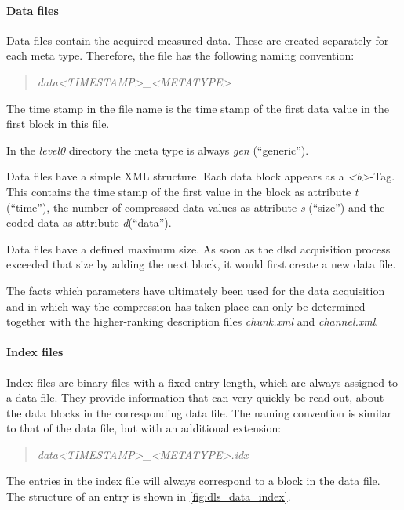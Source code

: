 \documentclass[a4paper,12pt,BCOR6mm,bibtotoc,idxtotoc]{scrbook}
\begin{document}
\paragraph{Data files} Data files contain the acquired measured data. These are created separately for each meta type. Therefore, the file has the following naming convention:

\begin{quote} \textit{data\textless TIMESTAMP\textgreater\_\textless METATYPE\textgreater} \end{quote}

The time stamp in the file name is the time stamp of the first data value in the first block in this file.

In the \textit{level0} directory the meta type is always \textit{gen} (``generic'').

Data files have a simple XML structure. Each data block appears as a \textit{\textless b\textgreater}-Tag. This contains the time stamp of the first value in the block as attribute \textit{t} (``time''), the number of compressed data values as attribute \textit{s} (``size'') and the coded data as attribute \textit{d}(``data'').

Data files have a defined maximum size. As soon as the dlsd acquisition process exceeded that size by adding the next block, it would first create a new data file.

The facts which parameters have ultimately been used for the data acquisition and in which way the compression has taken place can only be determined together with the higher-ranking description files \textit{chunk.xml} and \textit{channel.xml}.

\paragraph{Index files} Index files are binary files with a fixed entry length, which are always assigned to a data file. They provide information that can very quickly be read out, about the data blocks in the corresponding data file. The naming convention is similar to that of the data file, but with an additional extension:

\begin{quote} \textit{data\textless TIMESTAMP\textgreater\_\textless METATYPE\textgreater.idx} \end{quote}

The entries in the index file will always correspond to a block in the data
file. The structure of an entry is shown in \autoref{fig:dls_data_index}.
\end{document}
